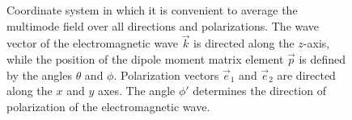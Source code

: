 \begin{figure}
\centering



\caption{Coordinate system in which it is convenient to average
  the multimode field over all directions and polarizations. The wave
  vector of the electromagnetic wave $\vec{k}$ is directed along the $z$-axis, while
  the position of the dipole moment matrix element $\vec{p}$
  is defined by the angles $\theta$ and $\phi$. Polarization vectors $\vec{e}_1$ and $\vec{e}_2$
are directed along the $x$ and $y$ axes. The angle $\phi'$ determines the direction
of polarization of the electromagnetic wave.}
\label{figPart1Ch2_6}
\end{figure}